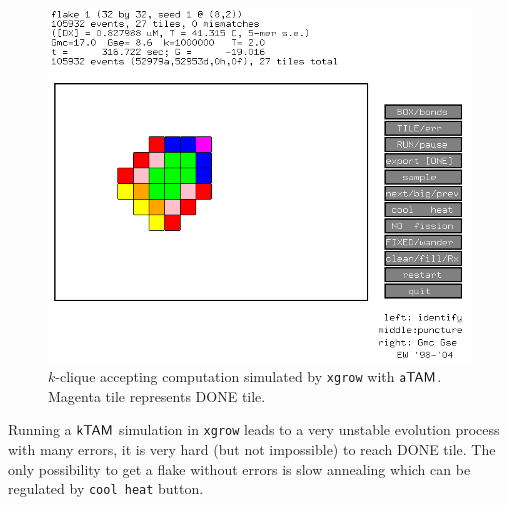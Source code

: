 \begin{figure}[h]
\begin{center}
	\includegraphics[scale=0.55]{./figures/xgrow/xgrow.png}
	\caption{$k$-clique accepting computation simulated by {\tt xgrow} with $\mathsf{aTAM}$. Magenta tile represents DONE tile.}
	\label{fig:xgrow}
\end{center}
\end{figure}

Running a $\mathsf{kTAM}$ simulation in {\tt xgrow} leads to a very unstable evolution process with many errors, it is very hard (but not impossible) to reach DONE tile. The only possibility to get a flake without errors is slow annealing which can be regulated by {\tt cool heat} button.